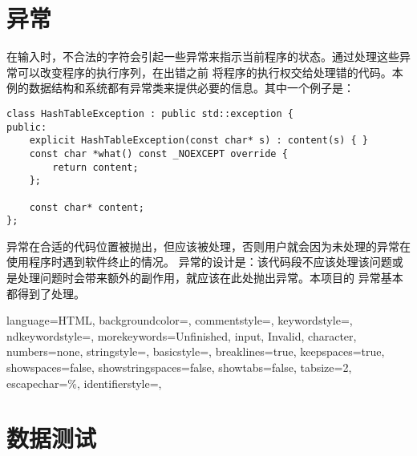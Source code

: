 
\chapter{异常}
在输入时，不合法的字符会引起一些异常来指示当前程序的状态。通过处理这些异常可以改变程序的执行序列，在出错之前%
将程序的执行权交给处理错的代码。本例的数据结构和系统都有异常类来提供必要的信息。其中一个例子是：
\begin{lstlisting}[firstnumber=244, caption=HashTableException 异常类]
class HashTableException : public std::exception {
public:
    explicit HashTableException(const char* s) : content(s) { }
    const char *what() const _NOEXCEPT override {
        return content;
    };

    const char* content;
};
\end{lstlisting}

异常在合适的代码位置被抛出，但应该被处理，否则用户就会因为未处理的异常在使用程序时遇到软件终止的情况。%
异常的设计是：该代码段不应该处理该问题或是处理问题时会带来额外的副作用，就应该在此处抛出异常。本项目的%
异常基本都得到了处理。


 {
    language=HTML,
    backgroundcolor=\color{CPPDark},   
    commentstyle=\color{CPPLight},
    keywordstyle=\color{red},
    ndkeywordstyle={},
    morekeywords={Unfinished, input, Invalid, character},
    numbers=none,
    stringstyle={},
    basicstyle=\fira\color{white}\footnotesize,
    breaklines=true,                                     
    keepspaces=true,                                     
    showspaces=false,                
    showstringspaces=false,
    showtabs=false,                  
    tabsize=2,
    escapechar=\%,
    identifierstyle={},
}

\chapter{数据测试}

